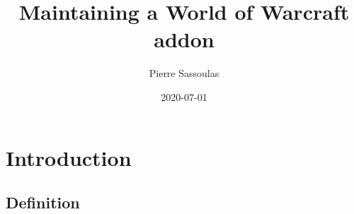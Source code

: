 \documentclass{beamer}
\begin{document}
\title{Maintaining a World of Warcraft addon}
\author{Pierre Sassoulas}
\date{2020-07-01}


\newcommand{\shrug}[1][]{%
\begin{tikzpicture}[baseline,x=0.8\ht\strutbox,y=0.8\ht\strutbox,line width=0.125ex,#1]
\def\arm{(-2.5,0.95) to (-2,0.95) (-1.9,1) to (-1.5,0) (-1.35,0) to (-0.8,0)};
\draw \arm;
\draw[xscale=-1] \arm;
\def\headpart{(0.6,0) arc[start angle=-40, end angle=40,x radius=0.6,y radius=0.8]};
\draw \headpart;
\draw[xscale=-1] \headpart;
\def\eye{(-0.075,0.15) .. controls (0.02,0) .. (0.075,-0.15)};
\draw[shift={(-0.3,0.8)}] \eye;
\draw[shift={(0,0.85)}] \eye;
\draw (-0.1,0.2) to [out=15,in=-100] (0.4,0.95);
\end{tikzpicture}}

\frame{\titlepage}


\section{Introduction}

\subsection{Definition}
\end{document}
